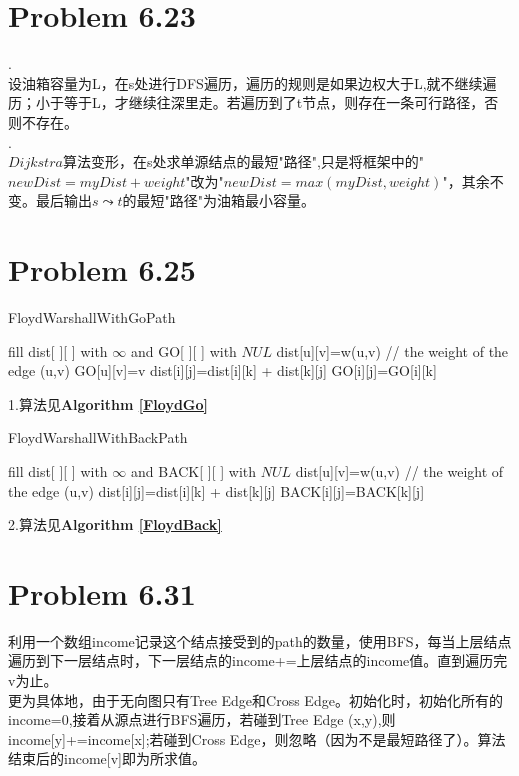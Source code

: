 \documentclass[twocolumn]{ctexart}
\begin{document}
\section*{Problem 6.23}
.\\
\indent 设油箱容量为L，在s处进行DFS遍历，遍历的规则是如果边权大于L,就不继续遍历；小于等于L，才继续往深里走。若遍历到了t节点，则存在一条可行路径，否则不存在。\\

.\\
\indent $Dijkstra$算法变形，在s处求单源结点的最短"路径",只是将框架中的"$newDist = myDist+weight$"改为"$newDist = max(myDist,weight)$"，其余不变。最后输出$s\leadsto t$的最短"路径"为油箱最小容量。\\

\section*{Problem 6.25}
\begin{algorithm}[htbp]
	\caption{FloydWarshallWithGoPath}
	\label{FloydGo}
	\begin{algorithmic}[1]
		\STATE fill dist[ ][ ] with $\infty$ and GO[ ][ ] with $NUL$
		\STATE dist[u][v]=w(u,v)  // the weight of the edge (u,v)
		\STATE GO[u][v]=v
		\ENDFOR
		\STATE 	dist[i][j]=dist[i][k] + dist[k][j]
		\STATE	GO[i][j]=GO[i][k]
		\ENDIF
		\ENDFOR
		\ENDFOR
		\ENDFOR
	\end{algorithmic}
\end{algorithm}

\noindent 1.算法见\textbf{Algorithm \ref{FloydGo}}\\

\begin{algorithm}[htbp]
	\caption{FloydWarshallWithBackPath}
	\label{FloydBack}
	\begin{algorithmic}[1]
		\STATE fill dist[ ][ ] with $\infty$ and BACK[ ][ ] with $NUL$
		\STATE dist[u][v]=w(u,v)  // the weight of the edge (u,v)
		\ENDFOR
		\STATE 	dist[i][j]=dist[i][k] + dist[k][j]
		\STATE	BACK[i][j]=BACK[k][j]
		\ENDIF
		\ENDFOR
		\ENDFOR
		\ENDFOR
	\end{algorithmic}
\end{algorithm}

\noindent2.算法见\textbf{Algorithm \ref{FloydBack}}\\


\section*{Problem 6.31}
\indent 利用一个数组income记录这个结点接受到的path的数量，使用BFS，每当上层结点遍历到下一层结点时，下一层结点的income+=上层结点的income值。直到遍历完v为止。\\
\indent 更为具体地，由于无向图只有Tree Edge和Cross Edge。初始化时，初始化所有的income=0,接着从源点进行BFS遍历，若碰到Tree Edge (x,y),则income[y]+=income[x];若碰到Cross Edge，则忽略（因为不是最短路径了）。算法结束后的income[v]即为所求值。 
\end{document}
